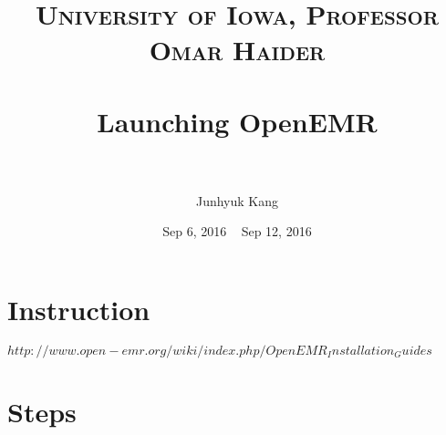 \documentclass[paper=a4, fontsize=11pt]{scrartcl} %
\title{	
\normalfont \normalsize 
\textsc{University of Iowa, Professor Omar Haider} \\ [25pt] %
\horrule{0.5pt} \\[0.4cm] %
\huge Launching OpenEMR \\ %
\horrule{2pt} \\[0.5cm] %
}
\author{Junhyuk Kang} %
\date{Sep 6, 2016 ~ Sep 12, 2016 } %
\numberwithin{equation}{section} %
\numberwithin{figure}{section} %
\numberwithin{table}{section} %
\begin{document}
\maketitle %


\section{Instruction}

$ http://www.open-emr.org/wiki/index.php/OpenEMR_Installation_Guides $





\section{Steps}

\end{document}
